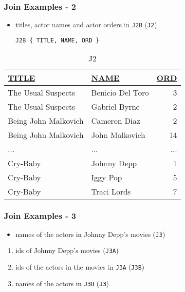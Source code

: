\documentclass[dvipsnames]{beamer}
\theoremstyle{plain}
\begin{document}
\begin{frame}[fragile]
  \frametitle{Join Examples - 2}

  \begin{itemize}
    \item titles, actor names and actor orders in \texttt{J2B}
      (\texttt{J2})
    \begin{lstlisting}
J2B { TITLE, NAME, ORD }
    \end{lstlisting}
  \end{itemize}

  \vspace{-10pt}
  \begin{tiny}
  \begin{table}
    \caption{J2}
    \begin{tabular}{|l|l|r|}\hline
\underline{TITLE}    & \underline{NAME} & \underline{ORD}\\[2pt]\hline\hline
The Usual Suspects   & Benicio Del Toro &   3\\\hline
The Usual Suspects   & Gabriel Byrne    &   2\\\hline
Being John Malkovich & Cameron Diaz     &   2\\\hline
Being John Malkovich & John Malkovich   &  14\\\hline
...                  & ...              & ...\\\hline
Cry-Baby             & Johnny Depp      &   1\\\hline
Cry-Baby             & Iggy Pop         &   5\\\hline
Cry-Baby             & Traci Lords      &   7\\\hline
    \end{tabular}
  \end{table}
  \end{tiny}
\end{frame}

\begin{frame}
  \frametitle{Join Examples - 3}

  \begin{itemize}
    \item names of the actors in Johnny Depp's movies (\texttt{J3})
  \end{itemize}

  \pause
  \begin{enumerate}
    \item ids of Johnny Depp's movies (\texttt{J3A})
    \item ids of the actors in the movies in \texttt{J3A} (\texttt{J3B})
    \item names of the actors in \texttt{J3B} (\texttt{J3})
  \end{enumerate}
\end{frame}
\end{document}
